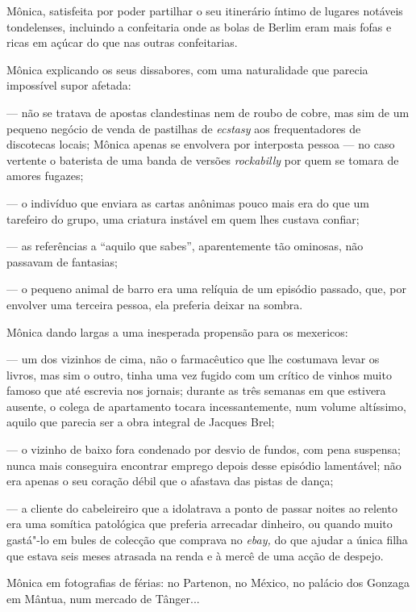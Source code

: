 Mônica, satisfeita por poder partilhar o seu itinerário íntimo de
lugares notáveis tondelenses, incluindo a confeitaria onde as bolas de
Berlim eram mais fofas e ricas em açúcar do que nas outras confeitarias.

Mônica explicando os seus dissabores, com uma naturalidade que parecia
impossível supor afetada:

--- não se tratava de apostas clandestinas nem de roubo de cobre, mas sim
  de um pequeno negócio de venda de pastilhas de \emph{ecstasy }aos
  frequentadores de discotecas locais; Mônica apenas se envolvera por
  interposta pessoa --- no caso vertente o baterista de uma banda de
  versões \emph{rockabilly }por quem se tomara de amores fugazes;

--- o indivíduo que enviara as cartas anônimas pouco mais era do que um
  tarefeiro do grupo, uma criatura instável em quem lhes custava
  confiar;

--- as referências a ``aquilo que sabes'', aparentemente tão ominosas, não
  passavam de fantasias;

--- o pequeno animal de barro era uma relíquia de um episódio passado,
  que, por envolver uma terceira pessoa, ela preferia deixar na sombra.


Mônica dando largas a uma inesperada propensão para os mexericos:

--- um dos vizinhos de cima, não o farmacêutico que lhe costumava levar os
  livros, mas sim o outro, tinha uma vez fugido com um crítico de
  vinhos muito famoso que até escrevia nos jornais; durante as três
  semanas em que estivera ausente, o colega de apartamento tocara
  incessantemente, num volume altíssimo, aquilo que parecia ser a obra
  integral de Jacques Brel;


--- o vizinho de baixo fora condenado por desvio de fundos, com pena
  suspensa; nunca mais conseguira encontrar emprego depois desse
  episódio lamentável; não era apenas o seu coração débil que o afastava
  das pistas de dança;

--- a cliente do cabeleireiro que a idolatrava a ponto de passar noites ao
  relento era uma somítica patológica que preferia arrecadar dinheiro,
  ou quando muito gastá"-lo em bules de colecção que comprava no
  \emph{ebay, }do que ajudar a única filha que estava seis meses
  atrasada na renda e à mercê de uma acção de despejo.


Mônica em fotografias de férias: no Partenon, no México, no palácio
dos Gonzaga em Mântua, num mercado de Tânger...

